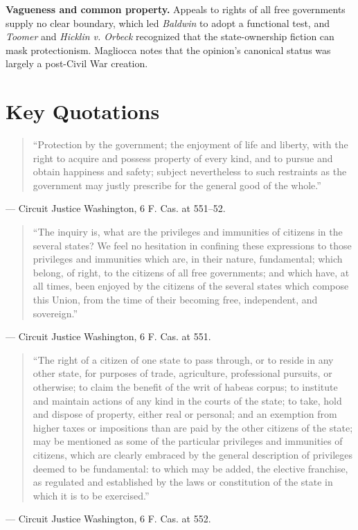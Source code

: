 \documentclass[12pt]{article}
\begin{document}
\textbf{Vagueness and common property.} Appeals to rights of all free governments supply no clear boundary, which led \textit{Baldwin} to adopt a functional test, and \textit{Toomer} and \textit{Hicklin v. Orbeck} recognized that the state-ownership fiction can mask protectionism. Magliocca notes that the opinion's canonical status was largely a post-Civil War creation.

\section{Key Quotations}

\begin{quote}
``Protection by the government; the enjoyment of life and liberty, with the right to acquire and possess property of every kind, and to pursue and obtain happiness and safety; subject nevertheless to such restraints as the government may justly prescribe for the general good of the whole.''
\end{quote}
\noindent --- Circuit Justice Washington, 6 F. Cas. at 551--52.

\begin{quote}
``The inquiry is, what are the privileges and immunities of citizens in the several states? We feel no hesitation in confining these expressions to those privileges and immunities which are, in their nature, fundamental; which belong, of right, to the citizens of all free governments; and which have, at all times, been enjoyed by the citizens of the several states which compose this Union, from the time of their becoming free, independent, and sovereign.''
\end{quote}
\noindent --- Circuit Justice Washington, 6 F. Cas. at 551.

\begin{quote}
``The right of a citizen of one state to pass through, or to reside in any other state, for purposes of trade, agriculture, professional pursuits, or otherwise; to claim the benefit of the writ of habeas corpus; to institute and maintain actions of any kind in the courts of the state; to take, hold and dispose of property, either real or personal; and an exemption from higher taxes or impositions than are paid by the other citizens of the state; may be mentioned as some of the particular privileges and immunities of citizens, which are clearly embraced by the general description of privileges deemed to be fundamental: to which may be added, the elective franchise, as regulated and established by the laws or constitution of the state in which it is to be exercised.''
\end{quote}
\noindent --- Circuit Justice Washington, 6 F. Cas. at 552.
\end{document}
